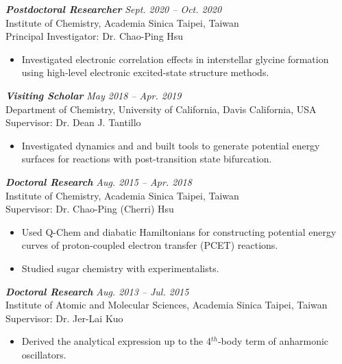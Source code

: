 {\sl \bf Postdoctoral Researcher} \hfill \textit{Sept. 2020 -- Oct. 2020}\\
Institute of Chemistry, Academia Sinica \hfill Taipei, Taiwan \\
Principal Investigator: Dr. Chao-Ping Hsu \\
\vspace{-10pt}
\begin{itemize}
    \item Investigated electronic correlation effects in interstellar glycine formation using high-level electronic excited-state structure methods.
\end{itemize}

{\sl \bf Visiting Scholar} \hfill \textit{May 2018 -- Apr. 2019} \\
Department of Chemistry, University of California, Davis \hfill California, USA\\
Supervisor: Dr. Dean J. Tantillo \\
\vspace{-10pt}
\begin{itemize} %
    \item Investigated dynamics and and built tools to generate potential energy surfaces for reactions with post-transition state bifurcation.
\end{itemize}

{\sl \bf Doctoral Research} \hfill \textit{Aug. 2015 -- Apr. 2018} \\
Institute of Chemistry, Academia Sinica \hfill Taipei, Taiwan \\
Supervisor: Dr. Chao-Ping (Cherri) Hsu \\
\vspace{-10pt}
\begin{itemize} %
    \item Used Q-Chem and diabatic Hamiltonians for constructing 
    potential energy curves of proton-coupled electron transfer (PCET) reactions.
    \item Studied sugar chemistry with experimentalists.
\end{itemize}

{\sl \bf Doctoral Research}  \hfill \textit{Aug. 2013 -- Jul. 2015} \\
Institute of Atomic and Molecular Sciences, Academia Sinica \hfill Taipei, Taiwan \\
Supervisor: Dr. Jer-Lai Kuo \\

\vspace{-10pt}
\begin{itemize} %
    \item Derived the analytical expression up to the 4$^{th}$-body term of anharmonic oscillators.
\end{itemize}

